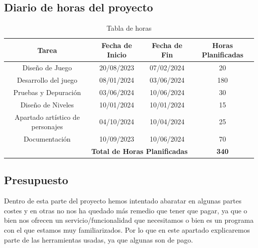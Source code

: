 \documentclass[a4paper]{article}
\begin{document}
\subsection{Diario de horas del proyecto}
\begin{table}[ht]
    \centering
    \begin{tabular}{|c|c|c|c|}
        \hline
        \textbf{Tarea}                                             & \textbf{Fecha de Inicio} & \textbf{Fecha de Fin} & \textbf{Horas Planificadas} \\
        \hline
        Diseño de Juego                                            & 20/08/2023               & 07/02/2024            & 20                          \\
        \hline
        Desarrollo del juego                                       & 08/01/2024               & 03/06/2024            & 180                         \\
        \hline
        Pruebas y Depuración                                       & 03/06/2024               & 10/06/2024            & 30                          \\
        \hline
        Diseño de Niveles                                          & 10/01/2024               & 10/01/2024            & 15                          \\
        \hline
        Apartado artístico de personajes                           & 04/10/2024               & 10/04/2024            & 25                          \\
        \hline
        Documentación                                              & 10/09/2023               & 10/06/2024            & 70                          \\
        \hline
        \multicolumn{3}{|r|}{\textbf{Total de Horas Planificadas}} & \textbf{340}                                                                   \\
        \hline
    \end{tabular}
    \caption{Tabla de horas}
    \label{tab:planificacion-horas}
\end{table}
\clearpage
\subsection{Presupuesto}

Dentro de esta parte del proyecto hemos intentado abaratar en algunas partes costes y en otras no nos ha quedado más remedio que tener que pagar, ya que o bien nos ofrecen un servicio/funcionalidad que necesitamos o bien es un programa con el que estamos muy familiarizados. Por lo que en este apartado explicaremos parte de las herramientas usadas, ya que algunas son de pago. \\
\end{document}
